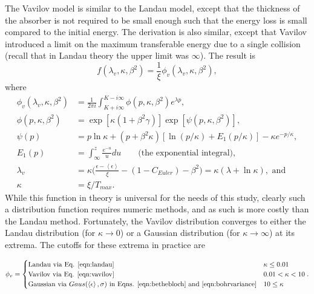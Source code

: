 \label{sec:ICOOLVavilov}\par
The Vavilov model \cite{vavilov} is similar to the Landau model, except that the thickness of the absorber is not required to be small enough such that the energy loss is small compared to the initial energy. The derivation is also similar, except that Vavilov introduced a limit on the maximum transferable energy due to a single collision (recall that in Landau theory the upper limit was $\infty$). The result is
\begin{equation}\label{eqn:vavilov}
f(\lambda_v, \kappa, \beta^2)=\frac{1}{\xi}\phi_v (\lambda_v , \kappa, \beta^2),
\end{equation}
where
\begin{align*}
\phi_v (\lambda_v,\kappa,\beta^2)&=\frac{1}{2\pi i}\int_{K+i\infty} ^{K-i\infty} \phi(p,\kappa,\beta^2) e^{\lambda p},\\
\phi(p,\kappa,\beta^2)&=\exp[\kappa(1+\beta^2 \gamma)]\exp[\psi(p,\kappa,\beta^2)],\\
\psi(p)&=p\ln \kappa + (p+\beta^2\kappa)[\ln(p/\kappa)+E_1 (p/\kappa)]-\kappa e^{-p/\kappa},\\
E_1 (p)&= \int_\infty ^z \frac{e^{-u}}{u} du \qquad \text{(the exponential integral)},\\
\lambda_v &= \kappa\Big(\frac{\epsilon-\left<\epsilon\right>}{\xi}-(1-C_{Euler})-\beta^2\Big)= \kappa(\lambda+\ln\kappa),\text{ and}\\
\kappa&=\xi/T_{max}.
\end{align*}
While this function in theory is universal for the needs of this study, clearly such a distribution function requires numeric methods, and as such is more costly than the Landau method. Fortunately, the Vavilov distribution converges to either the Landau distribution (for $\kappa\rightarrow 0$) or a Gaussian distribution (for $\kappa\rightarrow\infty$) at its extrema. The cutoffs for these extrema in practice are

\begin{align*}
\phi_v=
	\begin{cases}
	\text{Landau via Eq. \eqref{eqn:landau}} & \kappa\leq 0.01\\
	\text{Vavilov via Eq. \eqref{eqn:vavilov}} & 0.01 < \kappa < 10\\
	\text{Gaussian via }Gaus(\left<\epsilon\right>,\sigma)\text{ in Eqns. \ref{eqn:bethebloch} and \ref{eqn:bohrvariance}} & 10\leq\kappa
	\end{cases}.
\end{align*}


